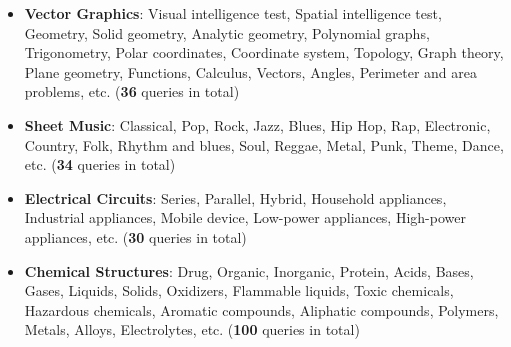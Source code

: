 \begin{itemize}[noitemsep, topsep=0pt, leftmargin=*]
    \item \textbf{Vector Graphics}: Visual intelligence test, Spatial intelligence test, Geometry, Solid geometry, Analytic geometry, Polynomial graphs, Trigonometry, Polar coordinates, Coordinate system, Topology, Graph theory, Plane geometry, Functions, Calculus, Vectors, Angles, Perimeter and area problems, etc. (\textbf{36} queries in total)

    \item \textbf{Sheet Music}: Classical, Pop, Rock, Jazz, Blues, Hip Hop, Rap, Electronic, Country, Folk, Rhythm and blues, Soul, Reggae, Metal, Punk, Theme, Dance, etc. (\textbf{34} queries in total)
    
    \item \textbf{Electrical Circuits}: Series, Parallel, Hybrid, Household appliances, Industrial appliances, Mobile device, Low-power appliances, High-power appliances, etc. (\textbf{30} queries in total)

    \item \textbf{Chemical Structures}: Drug, Organic, Inorganic, Protein, Acids, Bases, Gases, Liquids, Solids, Oxidizers, Flammable liquids, Toxic chemicals, Hazardous chemicals, Aromatic compounds, Aliphatic compounds, Polymers, Metals, Alloys, Electrolytes, etc. (\textbf{100} queries in total)


\end{itemize}
